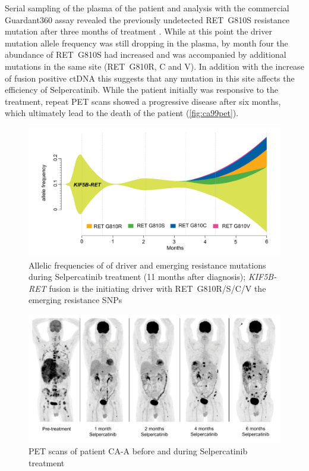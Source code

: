 Serial sampling of the plasma of the patient and analysis with the commercial Guardant360 assay \cite{Talasaz2014} revealed the previously undetected RET~G810S resistance mutation after three months of treatment . While at this point the driver mutation allele frequency was still dropping in the plasma, by month four the abundance of RET~G810S had increased and was accompanied by additional mutations in the same site (RET~G810R, C and V). In addition with the increase of fusion positive ctDNA this suggests that any mutation in this site affects the efficiency of Selpercatinib. While the patient initially was responsive to the treatment, repeat PET scans showed a progressive disease after six months, which ultimately lead to the death of the patient (\autoref{fig:ca99pet}).

\begin{figure}[ht]
\centering
\includegraphics[width=.99\linewidth]{Figures/CASCADE/CA99/CA-A_ctDNAstream}
\caption[Allelic frequencies of of driver and emerging resistance mutations]{Allelic frequencies of of driver and emerging resistance mutations during Selpercatinib treatment (11 months after diagnosis); \textit{KIF5B-RET} fusion is the initiating driver with RET~G810R/S/C/V the emerging resistance SNPs} \label{fig:ca99ctDNA}
\end{figure}


\begin{figure}[ht]
\centering
\includegraphics[width=.99\linewidth]{Figures/CASCADE/CA99/CA-A_PETscans}
\caption[PET scans of patient CA-A before and during Selpercatinib treatment]{PET scans of patient CA-A before and during Selpercatinib treatment} \label{fig:ca99pet}
\end{figure}


